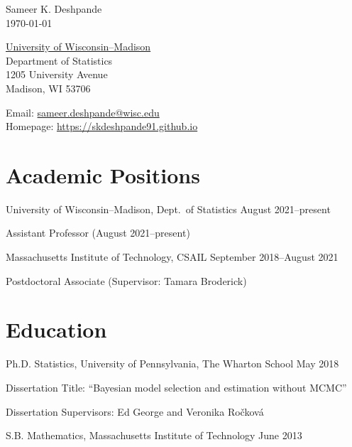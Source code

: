 \documentclass[10pt]{article}
\renewenvironment{itemize}{
  \begin{list}{}{
    \setlength{\leftmargin}{1.5em}
  }
}{
  \end{list}
}
\begin{document}
\begin{center}
{ \Large Sameer K. Deshpande } \\
\monthyeardate\today
\end{center}

\begin{minipage}{0.35\linewidth}
  \href{http://www.wisc.edu}{University of Wisconsin--Madison} \\
  Department of Statistics \\
  1205 University Avenue \\
  Madison, WI 53706
\end{minipage}
\hfill
\begin{minipage}{0.48\linewidth}
Email: \url{sameer.deshpande@wisc.edu} \\
Homepage: \url{https://skdeshpande91.github.io}
\end{minipage}

\section*{Academic Positions}
\begin{itemize}
\item{University of Wisconsin--Madison, Dept.\ of Statistics \hfill August 2021--present}
\begin{itemize}
\item{Assistant Professor (August 2021--present)}
\end{itemize}
\item{Massachusetts Institute of Technology, CSAIL \hfill September 2018--August 2021}
\begin{itemize}
\item{Postdoctoral Associate (Supervisor: Tamara Broderick)}
\end{itemize}
\end{itemize}

\section*{Education}
\begin{itemize}
\item{Ph.D. Statistics, University of Pennsylvania, The Wharton School \hfill May 2018}
\begin{itemize}
\item{Dissertation Title: ``Bayesian model selection and estimation without MCMC''}
\item{Dissertation Supervisors: Ed George and Veronika Ro\v{c}kov\'{a}}
\end{itemize}
\item{S.B. Mathematics, Massachusetts Institute of Technology \hfill June 2013}
\end{itemize}
\end{document}
